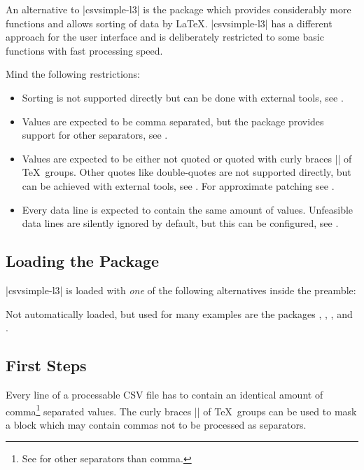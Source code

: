 \documentclass[a4paper,11pt]{ltxdoc}
\begin{document}
An alternative to |csvsimple-l3| is the  package
which provides considerably more functions and allows sorting of data by \LaTeX.
|csvsimple-l3| has a different approach for the user interface and
is deliberately restricted to some basic functions with fast
processing speed.

Mind the following restrictions:
\begin{itemize}
\item Sorting is not supported directly but can be done
  with external tools, see .
\item Values are expected to be comma separated, but the package
  provides support for other separators, see .
\item Values are expected to be either not quoted or quoted with
  curly braces |{}| of \TeX\ groups. Other quotes like double-quotes
  are not supported directly, but can be achieved
  with external tools, see .
  For approximate patching see .
\item Every data line is expected to contain the same amount of values.
  Unfeasible data lines are silently ignored by default, but this can
  be configured, see .
\end{itemize}


\subsection{Loading the Package}
|csvsimple-l3| is loaded with \emph{one} of the following
alternatives inside the preamble:
\begin{dispListing}
\usepackage[l3]{csvsimple}
\usepackage{csvsimple-l3}
\end{dispListing}

Not automatically loaded, but used for many examples are the packages
, , , and .


\clearpage
\subsection{First Steps}
Every line of a processable CSV file has to contain an identical amount of
comma\footnote{See  for other separators than comma.} separated values. The curly braces |{}| of \TeX\ groups can be used
to mask a block which may contain commas not to be processed as separators.
\end{document}
